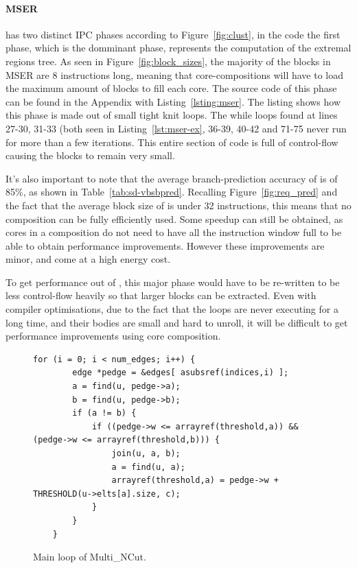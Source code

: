 \paragraph*{MSER}
 has two distinct IPC phases according to Figure~\ref{fig:clust}, in the code the first phase, which is the domminant phase, represents the computation of the extremal regions tree.
As seen in Figure~\ref{fig:block_sizes}, the majority of the blocks in MSER are 8 instructions long, meaning that core-compositions will have to load the maximum amount of blocks to fill each core.
The source code of this phase can be found in the Appendix with Listing~\ref{lsting:mser}.
The listing shows how this phase is made out of small tight knit loops.
The while loops found at lines 27-30, 31-33 (both seen in Listing~\ref{lst:mser-ex}, 36-39, 40-42 and 71-75 never run for more than a few iterations.
This entire section of code is full of control-flow causing the blocks to remain very small.

It's also important to note that the average branch-prediction accuracy of  is of 85\%, as shown in Table~\ref{tab:sd-vbsbpred}.
Recalling Figure~\ref{fig:req_pred} and the fact that the average block size of  is under 32 instructions, this means that no composition can be fully efficiently used.
Some speedup can still be obtained, as cores in a composition do not need to have all the instruction window full to be able to obtain performance improvements.
However these improvements are minor, and come at a high energy cost.

To get performance out of , this major phase would have to be re-written to be less control-flow heavily so that larger blocks can be extracted.
Even with compiler optimisations, due to the fact that the loops are never executing for a long time, and their bodies are small and hard to unroll, it will be difficult to get performance improvements using core composition.

\begin{figure}[t]
\lstset{language=C,numbersep=4pt}
\begin{center}
\begin{lstlisting}[firstnumber=49]
 for (i = 0; i < num_edges; i++) {
        edge *pedge = &edges[ asubsref(indices,i) ];
		a = find(u, pedge->a);
        b = find(u, pedge->b);
        if (a != b) {
            if ((pedge->w <= arrayref(threshold,a)) && (pedge->w <= arrayref(threshold,b))) {
	            join(u, a, b);
	            a = find(u, a);
	            arrayref(threshold,a) = pedge->w + THRESHOLD(u->elts[a].size, c);
            }
        }
    }
\end{lstlisting}
\end{center}
\vspace{-1em}
\caption{Main loop of Multi\_NCut.}
\label{lst:multi_loop}
\vspace{1em}
\end{figure}

